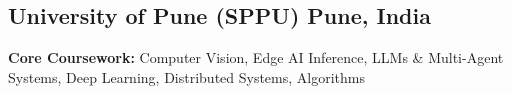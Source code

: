 
\subsection[University of Pune (SPPU)]{{University of Pune (SPPU)} \hfill Pune, India}
\vspace{0.05em}
{\footnotesize \textbf{Core Coursework:} Computer Vision, Edge AI Inference, LLMs \& Multi-Agent Systems, Deep Learning, Distributed Systems, Algorithms}
